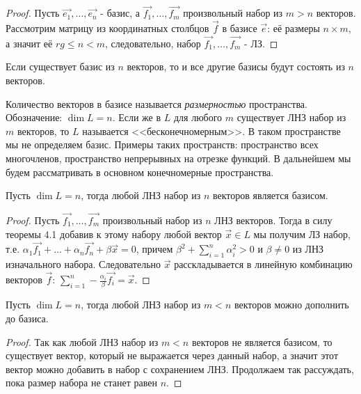 \begin{proof}
    Пусть $\vec{e_1}, \dots, \vec{e_n}$ - базис, а $\vec{f_1}, \dots, \vec{f_m}$ произвольный набор из $m>n$ векторов. Рассмотрим матрицу из координатных столбцов $\vec{f}$ в базисе $\vec{e}$: её размеры $n \times m$, а значит её $rg \leqslant n<m$, следовательно, набор $\vec{f_1}, \dots, \vec{f_m}$ - ЛЗ.
\end{proof}
\begin{corollary}
    Если существует базис из $n$ векторов, то и все другие базисы будут состоять из $n$ векторов.
\end{corollary}
\label{Размерность.}
Количество векторов в базисе называется \textit{размерностью} пространства. Обозначение: $\dim{L}=n$. Если же в $L$ для любого $m$ существует ЛНЗ набор из $m$ векторов, то $L$ называется <<бесконечномерным>>. В таком пространстве мы не определяем базис. Примеры таких пространств: пространство всех многочленов, пространство непрерывных на отрезке функций. В дальнейшем мы будем рассматривать в основном конечномерные пространства.
\begin{proposition}
    Пусть $\dim{L}=n$, тогда любой ЛНЗ набор из $n$ векторов является базисом.
\end{proposition}
\begin{proof}
    Пусть $\vec{f_1}, \dots, \vec{f_m}$ произвольный набор из $n$ ЛНЗ векторов. Тогда в силу теоремы 4.1 добавив к этому набору любой вектор $\vec{x} \in L$ мы получим ЛЗ набор, т.е. $\alpha_1 \vec{f_1} + \dots +\alpha_n \vec{f_n} + \beta \vec{x}=0$, причем $\beta^2+\sum_{i=1}^n \alpha_i^2 >0$ и $\beta \neq 0$ из ЛНЗ изначального набора. Следовательно $\vec{x}$ расскладывается в линейную комбинацию векторов $\vec{f}$: $\sum_{i=1}^n -\frac{\alpha_i}{\beta} \vec{f_i}=\vec{x}$.
\end{proof}
\begin{proposition}
    Пусть  $\dim{L}=n$, тогда любой ЛНЗ набор из $m<n$ векторов можно дополнить до базиса.
\end{proposition}
\begin{proof}
    Так как любой ЛНЗ набор из $m<n$ векторов не является базисом, то существует вектор, который не выражается через данный набор, а значит этот вектор можно добавить в набор с сохранением ЛНЗ. Продолжаем так рассуждать, пока размер набора не станет равен $n$.
\end{proof}
